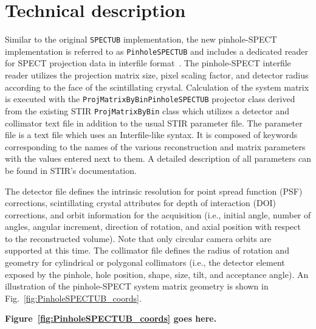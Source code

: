 \documentclass[utf8]{FrontiersinVancouver}
\begin{document}
\section{Technical description}

Similar to the original \texttt{SPECTUB} implementation, the new pinhole-SPECT implementation is referred to as \texttt{PinholeSPECTUB} and includes a dedicated reader for SPECT projection data in interfile format~\citep{todd-pokropek_file_1992}. The pinhole-SPECT interfile reader utilizes the projection matrix size, pixel scaling factor, and detector radius according to the face of the scintillating crystal. Calculation of the system matrix is executed with the \texttt{ProjMatrixByBinPinholeSPECTUB} projector class derived from the existing STIR \texttt{ProjMatrixByBin} class which utilizes a detector and collimator text file in addition to the usual STIR parameter file. The parameter file is a text file which uses an Interfile-like syntax. It is composed of keywords corresponding to the names of the various reconstruction and matrix parameters with the values entered next to them. A detailed description of all parameters can be found in STIR's documentation.

The detector file defines the intrinsic resolution for point spread function (PSF) corrections, scintillating crystal attributes for depth of interaction (DOI) corrections, and orbit information for the acquisition (i.e., initial angle, number of angles, angular increment, direction of rotation, and axial position with respect to the reconstructed volume). Note that only circular camera orbits are supported at this time. The collimator file defines the radius of rotation and geometry for cylindrical or polygonal collimators (i.e., the detector element exposed by the pinhole, hole position, shape, size, tilt, and acceptance angle). An illustration of the pinhole-SPECT system matrix geometry is shown in Fig.~\ref{fig:PinholeSPECTUB_coords}.

\noindent \textbf{Figure~\ref{fig:PinholeSPECTUB_coords} goes here.}
\end{document}

